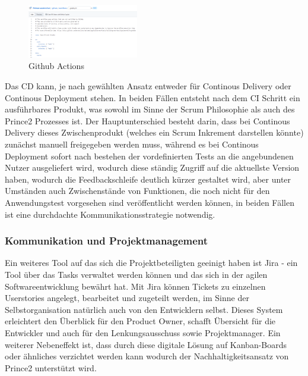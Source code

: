 \begin{figure}[!h]
\centering
\includegraphics[width=4.86cm, height=2.35cm]{githubactions}
\caption{Github Actions}
\end{figure}

Das CD kann, je nach gewählten Ansatz entweder für Continous Delivery oder Continous Deployment stehen. In beiden Fällen entsteht nach dem CI Schritt ein ausführbares Produkt, was sowohl im Sinne der Scrum Philosophie als auch des Prince2 Prozesses ist. Der Hauptunterschied besteht darin, dass bei Continous Delivery dieses Zwischenprodukt (welches ein Scrum Inkrement darstellen könnte) zunächst manuell freigegeben werden muss, während es bei Continous Deployment sofort nach bestehen der vordefinierten Tests an die angebundenen Nutzer ausgeliefert wird, wodurch diese ständig Zugriff auf die aktuellste Version haben, wodurch die Feedbackschleife deutlich kürzer gestaltet wird, aber unter Umständen auch Zwischenstände von Funktionen, die noch nicht für den Anwendungstest vorgesehen sind veröffentlicht werden können, in beiden Fällen ist eine durchdachte Kommunikationsstrategie notwendig.


\subsubsection{Kommunikation und Projektmanagement}

Ein weiteres Tool auf das sich die Projektbeteiligten geeinigt haben ist Jira \cite{jira} - ein Tool über das Tasks verwaltet werden können und das sich in der agilen Softwareentwicklung bewährt hat. Mit Jira können Tickets zu einzelnen Userstories angelegt, bearbeitet und zugeteilt werden, im Sinne der Selbstorganisation natürlich auch von den Entwicklern selbst. Dieses System erleichtert den Überblick für den Product Owner, schafft Übersicht für die Entwickler und auch für den Lenkungsausschuss sowie Projektmanager. Ein weiterer Nebeneffekt ist, dass durch diese digitale Lösung auf Kanban-Boards oder ähnliches verzichtet werden kann wodurch der Nachhaltigkeitsansatz von Prince2 unterstützt wird.\\

